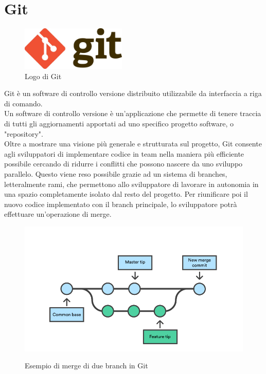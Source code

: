 \section{Git}
\begin{figure}[h]
\begin{center}
  \includegraphics[width=5cm]{images/git_logo.jpg}
  \caption{Logo di Git}\label{fig:git}
\end{center}
\end{figure}
\FloatBarrier
Git è un software di controllo versione distribuito utilizzabile da interfaccia a riga di comando. \cite{GIT}\\
Un software di controllo versione è un'applicazione che permette di tenere traccia di tutti gli aggiornamenti apportati ad uno specifico progetto software, o "repository".\\
Oltre a mostrare una visione più generale e strutturata sul progetto, Git consente agli sviluppatori di implementare codice in team nella maniera più efficiente possibile cercando di ridurre i conflitti che possono nascere da uno sviluppo parallelo. Questo viene reso possibile grazie ad un sistema di branches, letteralmente rami, che permettono allo sviluppatore di lavorare in autonomia in una spazio completamente isolato dal resto del progetto. Per riunificare poi il nuovo codice implementato con il branch principale, lo sviluppatore potrà effettuare un'operazione di merge. \\
\begin{figure}[h]
\begin{center}
  \includegraphics[width=12cm]{images/merge-di-due-branch.png}\\
  \caption{Esempio di merge di due branch in Git}\label{fig:git}
\end{center}
\end{figure}
\FloatBarrier


